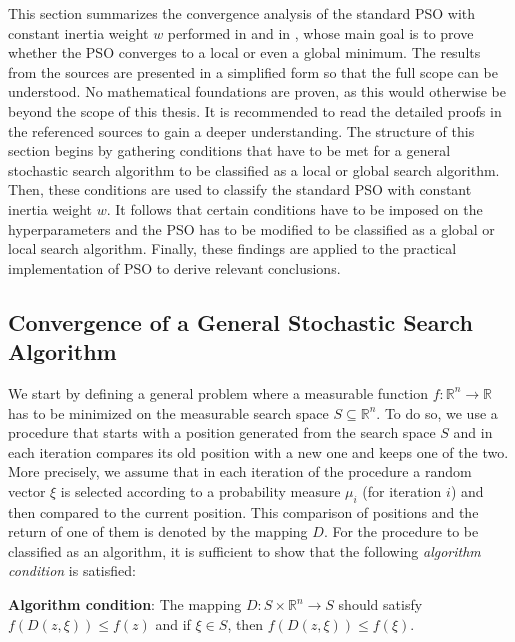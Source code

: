 \documentclass[
  oneside, a4paper, 12pt, openany]{book}
\theoremstyle{definition}
\theoremstyle{definition}
\theoremstyle{definition}
\theoremstyle{definition}
\theoremstyle{remark}
\begin{document}
This section summarizes the convergence analysis of the standard PSO with constant inertia weight \(w\) performed in \citep{FbEn2010} and in \citep{FbEn2007}, whose main goal is to prove whether the PSO converges to a local or even a global minimum. The results from the sources are presented in a simplified form so that the full scope can be understood. No mathematical foundations are proven, as this would otherwise be beyond the scope of this thesis. It is recommended to read the detailed proofs in the referenced sources to gain a deeper understanding. The structure of this section begins by gathering conditions that have to be met for a general stochastic search algorithm to be classified as a local or global search algorithm. Then, these conditions are used to classify the standard PSO with constant inertia weight \(w\). It follows that certain conditions have to be imposed on the hyperparameters and the PSO has to be modified to be classified as a global or local search algorithm. Finally, these findings are applied to the practical implementation of PSO to derive relevant conclusions.

\hypertarget{convergence-of-a-general-stochastic-search-algorithm}{%
\subsection{Convergence of a General Stochastic Search Algorithm}\label{convergence-of-a-general-stochastic-search-algorithm}}

We start by defining a general problem where a measurable function \(f: \mathbb{R}^n\rightarrow\mathbb{R}\) has to be minimized on the measurable search space \(S \subseteq \mathbb{R}^n\). To do so, we use a procedure that starts with a position generated from the search space \(S\) and in each iteration compares its old position with a new one and keeps one of the two. More precisely, we assume that in each iteration of the procedure a random vector \(\xi\) is selected according to a probability measure \(\mu_i\) (for iteration \(i\)) and then compared to the current position. This comparison of positions and the return of one of them is denoted by the mapping \(D\). For the procedure to be classified as an algorithm, it is sufficient to show that the following \emph{algorithm condition} is satisfied:

\textbf{Algorithm condition}: The mapping \(D: S \times \mathbb{R}^n\rightarrow S\) should satisfy \(f(D(z, \xi)) \leq f(z)\) and if \(\xi \in S\), then \(f(D(z, \xi)) \leq f(\xi)\).
\end{document}

